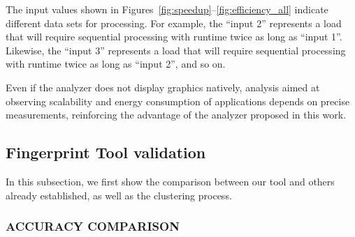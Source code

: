 The input values shown in Figures~\ref{fig:speedup}--\ref{fig:efficiency_all} indicate different data sets for processing. For example, the ``input 2'' represents a load that will require sequential processing with runtime twice as long as ``input 1''. Likewise, the ``input 3'' represents a load that will require sequential processing with runtime twice as long as ``input 2'', and so on.

Even if the analyzer does not display graphics natively, analysis aimed at observing scalability and energy consumption of applications depends on precise measurements, reinforcing the advantage of the analyzer proposed in this work.




\subsection{Fingerprint Tool validation}

In this subsection, we first show the comparison between our tool and others already established, as well as the clustering process.

\subsubsection{ACCURACY COMPARISON}

